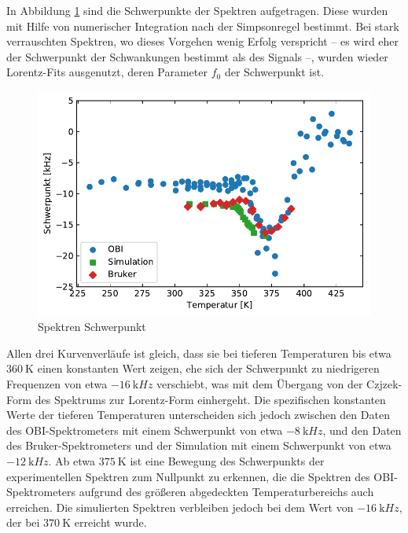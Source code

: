 In Abbildung \ref{fig:res:spek_mean} sind die Schwerpunkte der Spektren aufgetragen. Diese wurden mit Hilfe von numerischer Integration nach der Simpsonregel bestimmt. Bei stark verrauschten Spektren, wo dieses Vorgehen wenig Erfolg verspricht -- es wird eher der Schwerpunkt der Schwankungen bestimmt als des Signals --, wurden wieder Lorentz-Fits ausgenutzt, deren Parameter $f_0$ der Schwerpunkt ist.
\begin{figure}
	\begin{center}
		\includegraphics[width=\textwidth]{graphics/plot/mean.pdf} 
	\end{center}
	\caption{Spektren Schwerpunkt} \label{fig:res:spek_mean}
\end{figure}
Allen drei Kurvenverläufe ist gleich, dass sie bei tieferen Temperaturen bis etwa $\SI{360}{\kelvin}$ einen konstanten Wert zeigen, ehe sich der Schwerpunkt zu niedrigeren Frequenzen von etwa $\SI{-16}{\kilo Hz}$ verschiebt, was mit dem Übergang von der Czjzek-Form des Spektrums zur Lorentz-Form einhergeht. Die spezifischen konstanten Werte der tieferen Temperaturen unterscheiden sich jedoch zwischen den Daten des OBI-Spektrometers mit einem Schwerpunkt von etwa $\SI{-8}{\kilo Hz}$, und den Daten des Bruker-Spektrometers und der Simulation mit einem Schwerpunkt von etwa $\SI{-12}{\kilo Hz}$. Ab etwa $\SI{375}{\kelvin}$ ist eine Bewegung des Schwerpunkts der experimentellen Spektren zum Nullpunkt zu erkennen, die die Spektren des OBI-Spektrometers aufgrund des größeren abgedeckten Temperaturbereichs auch erreichen. Die simulierten Spektren verbleiben jedoch bei dem Wert von $\SI{-16}{\kilo Hz}$, der bei $\SI{370}{\kelvin}$ erreicht wurde.


